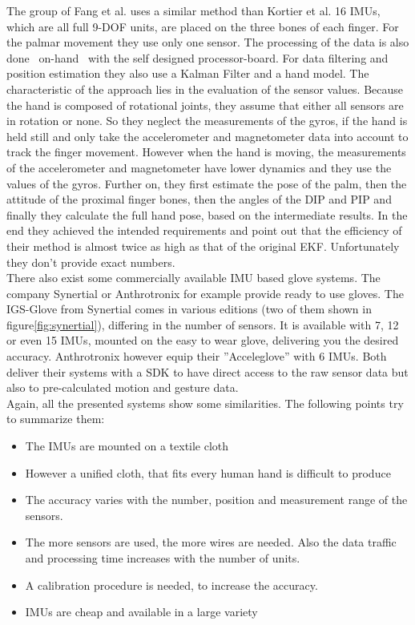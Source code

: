 The group of Fang et al. uses a similar method than Kortier et al. 16 \acp{IMU}, which are all full 9-\ac{DOF} units, are placed on the three bones of each finger. For the palmar movement they use only one sensor. The processing of the data is also done ~\grqq on-hand\grqq~ with the self designed processor-board. For data filtering and position estimation they also use a Kalman Filter and a hand model. The characteristic of the approach lies in the evaluation of the sensor values. Because the hand is composed of rotational joints, they assume that either all sensors are in rotation or none. So they neglect the measurements of the gyros, if the hand is held still and only take the accelerometer and magnetometer data into account to track the finger movement. However when the hand is moving, the measurements of the accelerometer and magnetometer have lower dynamics and they use the values of the gyros. Further on, they first estimate the pose of the palm, then the attitude of the proximal finger bones, then the angles of the DIP and PIP and finally they calculate the full hand pose, based on the intermediate results. In the end they achieved the intended requirements and point out that the efficiency of their method is almost twice as high as that of the original \ac{EKF}. Unfortunately they don't provide exact numbers.\\
There also exist some commercially available \ac{IMU} based glove systems. The company Synertial \cite{Synertial} or Anthrotronix \cite{anthrotronix} for example provide ready to use gloves. The IGS-Glove from Synertial comes in various editions (two of them shown in figure\ref{fig:synertial}), differing in the number of sensors. It is available with 7, 12 or even 15 \acp{IMU}, mounted on the easy to wear glove, delivering you the desired accuracy. Anthrotronix however equip their ''Acceleglove'' with 6 \acp{IMU}. Both deliver their systems with a \acs{SDK} to have direct access to the raw sensor data but also to pre-calculated motion and gesture data.\\

Again, all the presented systems show some similarities. The following points try to summarize them:
\begin{itemize}
\item The \acp{IMU} are mounted on a textile cloth
\item However a unified cloth, that fits every human hand is difficult to produce
\item The accuracy varies with the number, position and measurement range of the sensors.
\item The more sensors are used, the more wires are needed. Also the data traffic and processing time increases with the number of units.
\item A calibration procedure is needed, to increase the accuracy.
\item IMUs are cheap and available in a large variety
\end{itemize}

